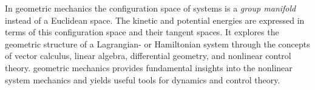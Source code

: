 %

In geometric mechanics the configuration space of systems is a \textit{group manifold} instead of a Euclidean space. The kinetic and potential energies are expressed in terms of this configuration space and their tangent spaces. It explores the geometric structure of a Lagrangian- or Hamiltonian system through the concepts of vector calculus, linear algebra, differential geometry, and nonlinear control theory. geometric mechanics provides fundamental insights into the nonlinear system mechanics and yields useful tools for dynamics and control theory.


